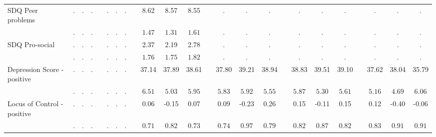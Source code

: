 \begin{center}
{\begin{longtable}{L{12em} c c c p{1.2em} c c c p{1.2em} c c c p{1.2em} c c c p{1.2em} c c c p{1.2em} c c c}
SDQ Peer problems & . &         . &         . & &         . &         . &         . & &      8.62 &      8.57 &      8.55 & &         . &         . &         . & &         . &         . &         . & &         . &         . &         . \\*
& $\mathit{        .}$ & $\mathit{        .}$ & $\mathit{        .}$ & & $\mathit{        .}$ & $\mathit{        .}$ & $\mathit{        .}$ & & $\mathit{     1.47}$ & $\mathit{     1.31}$ & $\mathit{     1.61}$ & & $\mathit{        .}$ & $\mathit{        .}$ & $\mathit{        .}$ & & $\mathit{        .}$ & $\mathit{        .}$ & $\mathit{        .}$ & & $\mathit{        .}$ & $\mathit{        .}$ & $\mathit{        .}$ \\[.7em]
SDQ Pro-social & . &         . &         . & &         . &         . &         . & &      2.37 &      2.19 &      2.78 & &         . &         . &         . & &         . &         . &         . & &         . &         . &         . \\*
& $\mathit{        .}$ & $\mathit{        .}$ & $\mathit{        .}$ & & $\mathit{        .}$ & $\mathit{        .}$ & $\mathit{        .}$ & & $\mathit{     1.76}$ & $\mathit{     1.75}$ & $\mathit{     1.82}$ & & $\mathit{        .}$ & $\mathit{        .}$ & $\mathit{        .}$ & & $\mathit{        .}$ & $\mathit{        .}$ & $\mathit{        .}$ & & $\mathit{        .}$ & $\mathit{        .}$ & $\mathit{        .}$ \\[.7em]
Depression Score - positive & . &         . &         . & &         . &         . &         . & &     37.14 &     37.89 &     38.61 & &     37.80 &     39.21 &     38.94 & &     38.83 &     39.51 &     39.10 & &     37.62 &     38.04 &     35.79 \\*
& $\mathit{        .}$ & $\mathit{        .}$ & $\mathit{        .}$ & & $\mathit{        .}$ & $\mathit{        .}$ & $\mathit{        .}$ & & $\mathit{     6.51}$ & $\mathit{     5.03}$ & $\mathit{     5.95}$ & & $\mathit{     5.83}$ & $\mathit{     5.92}$ & $\mathit{     5.55}$ & & $\mathit{     5.87}$ & $\mathit{     5.30}$ & $\mathit{     5.61}$ & & $\mathit{     5.16}$ & $\mathit{     4.69}$ & $\mathit{     6.06}$ \\[.7em]
Locus of Control - positive & . &         . &         . & &         . &         . &         . & &      0.06 &     -0.15 &      0.07 & &      0.09 &     -0.23 &      0.26 & &      0.15 &     -0.11 &      0.15 & &      0.12 &     -0.40 &     -0.06 \\*
& $\mathit{        .}$ & $\mathit{        .}$ & $\mathit{        .}$ & & $\mathit{        .}$ & $\mathit{        .}$ & $\mathit{        .}$ & & $\mathit{     0.71}$ & $\mathit{     0.82}$ & $\mathit{     0.73}$ & & $\mathit{     0.74}$ & $\mathit{     0.97}$ & $\mathit{     0.79}$ & & $\mathit{     0.82}$ & $\mathit{     0.87}$ & $\mathit{     0.82}$ & & $\mathit{     0.83}$ & $\mathit{     0.91}$ & $\mathit{     0.91}$ \\[.7em]

\end{longtable}}
\end{center}
